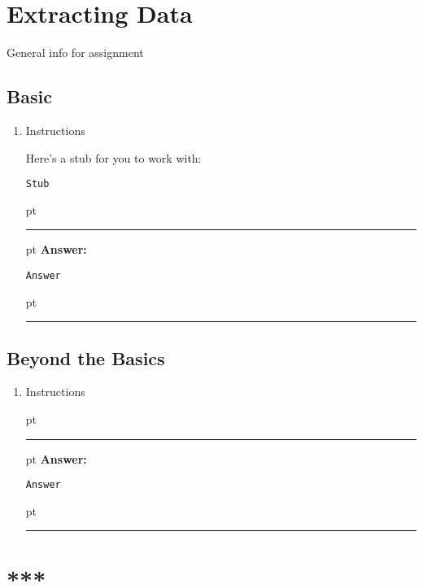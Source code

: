 \documentclass[11pt,oneside]{book}
\begin{document}
\chapter{Extracting Data}

General info for assignment

\section{Basic}

\begin{enumerate}
\item Instructions

Here's a stub for you to work with:
\begin{verbatim}
Stub
\end{verbatim}

\ifnum{}
 pt
\hrule
{} pt
{\bf Answer: }
\begin{verbatim}
Answer
\end{verbatim}
 pt
\hrule
\fi

\end{enumerate}

\section{Beyond the Basics}
\begin{enumerate}

\item Instructions

\ifnum{}
 pt
\hrule
{} pt
{\bf Answer: }
\begin{verbatim}
Answer
\end{verbatim}
 pt
\hrule
\fi

\end{enumerate}

\chapter{***}
\end{document}
